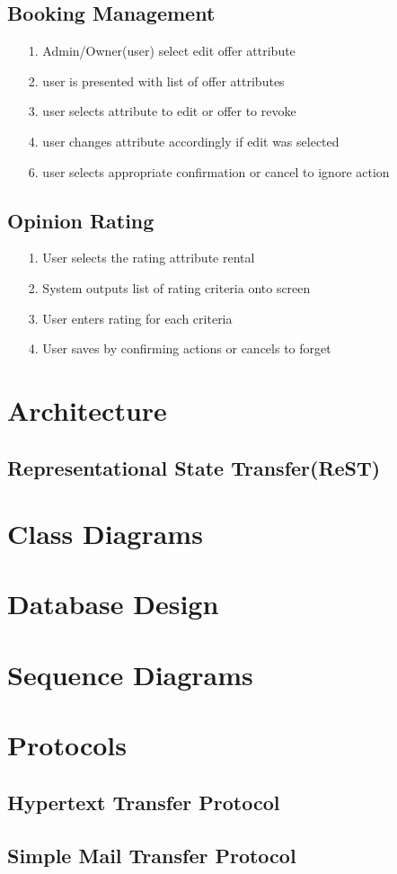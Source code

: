 \subsection {Booking Management}
 \begin{itemize}
		\item[1.] Admin/Owner(user) select edit offer attribute
		\item[2.] user is presented with list of offer attributes
		\item[3.] user selects attribute to edit or offer to revoke
		\item[4.] user changes attribute accordingly if edit was selected
		\item[6.] user selects appropriate confirmation or cancel to ignore action
\end{itemize}
\subsection {Opinion Rating}
\begin{itemize}
\item[1.] User selects the rating attribute  rental
\item[2.] System outputs list of rating criteria onto screen
\item[3.] User enters rating for each criteria
\item[4.] User saves by confirming actions or cancels to forget
\end{itemize}
\section{Architecture}
\subsection{Representational State Transfer(ReST)}
\section{Class Diagrams}
\section{Database Design}
\section{Sequence Diagrams}
\section{Protocols}
\subsection*{Hypertext Transfer Protocol}
\subsection*{Simple Mail Transfer Protocol}

